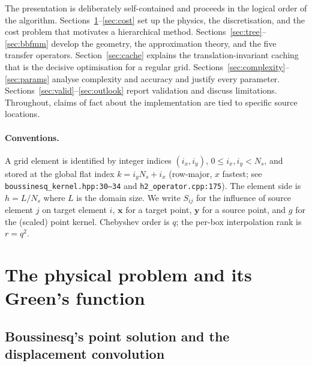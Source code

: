 \documentclass[11pt,a4paper]{article}
\newcommand{\xx}{\mathbf{x}}
\newcommand{\yy}{\mathbf{y}}
\newcommand{\code}[1]{\texttt{#1}}
\theoremstyle{definition}
\theoremstyle{remark}
\begin{document}
The presentation is deliberately self-contained and proceeds in the logical
order of the algorithm. Sections~\ref{sec:physics}--\ref{sec:cost} set up the
physics, the discretisation, and the cost problem that motivates a hierarchical
method. Sections~\ref{sec:tree}--\ref{sec:bbfmm} develop the geometry, the
approximation theory, and the five transfer operators. Section~\ref{sec:cache}
explains the translation-invariant caching that is the decisive optimisation
for a regular grid. Sections~\ref{sec:complexity}--\ref{sec:params} analyse
complexity and accuracy and justify every parameter. Sections~\ref{sec:valid}--\ref{sec:outlook}
report validation and discuss limitations. Throughout, claims of fact about the
implementation are tied to specific source locations.

\paragraph{Conventions.}
A grid element is identified by integer indices $(i_x,i_y)$, $0\le i_x,i_y<N_s$,
and stored at the global flat index $k=i_y N_s + i_x$ (row-major, $x$ fastest;
see \code{boussinesq\_kernel.hpp:30--34} and \code{h2\_operator.cpp:175}). The
element side is $h=L/N_s$ where $L$ is the domain size. We write $S_{ij}$ for the
influence of source element $j$ on target element $i$, $\xx$ for a target point,
$\yy$ for a source point, and $g$ for the (scaled) point kernel. Chebyshev order
is $q$; the per-box interpolation rank is $r=q^2$.

\section{The physical problem and its Green's function}
\label{sec:physics}

\subsection{Boussinesq's point solution and the displacement convolution}
\end{document}
